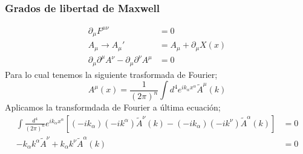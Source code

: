 \documentclass[../main.tex]{subfiles}
\begin{document}
  \subsubsection{Grados de libertad de Maxwell}
  \begin{align*}
    \partial_\mu F^{\mu\nu} & = 0 \\
    A_\mu \rightarrow A_\mu'& = A_\mu + \partial_\mu X(x) \\
    \partial_\mu \partial^\mu A^\nu - \partial_\mu \partial^\nu A^\mu & = 0
  \end{align*}
Para lo cual tenemos la siguiente trasformada de Fourier;
\begin{equation}
  A^\mu(x) = \frac{1}{(2\pi)^n}\int d^4 e^{ik_\alpha x^\alpha}\tilde{A}^\mu(k)
 \end{equation}
 Aplicamos la transformdada de Fourier a última ecuación;
 \begin{align*}
   \int \frac{d^4}{(2\pi)^n} e^{ik_\alpha x^\alpha} \left[ \left( -ik_\alpha \right) \left( -ik^\alpha \right) \tilde{A}^\nu(k) - \left( -ik_\alpha \right)  \left( -ik^\nu \right)\tilde{A}^\alpha(k)\right] & = 0 \\
   -k_\alpha k^\alpha \tilde{A}^\nu + k_\alpha k^\nu \tilde{A}^\alpha(k) & = 0 
 \end{align*}
 
\end{document}
